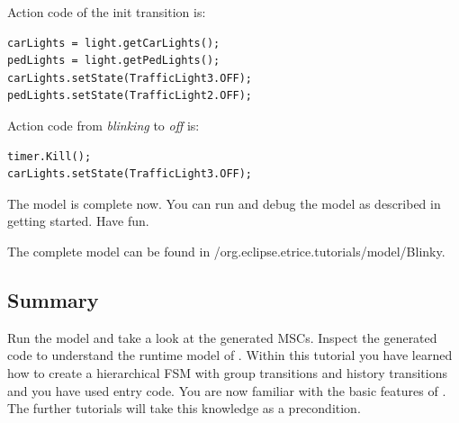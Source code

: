 Action code of the init transition is:

\begin{verbatim}
carLights = light.getCarLights();
pedLights = light.getPedLights();
carLights.setState(TrafficLight3.OFF);
pedLights.setState(TrafficLight2.OFF);
\end{verbatim}

Action code from \textit{blinking} to \textit{off} is:

\begin{verbatim}
timer.Kill();
carLights.setState(TrafficLight3.OFF); 
\end{verbatim}

The model is complete now. You can run and debug the model as described in getting started. Have fun.

The complete model can be found in /org.eclipse.etrice.tutorials/model/Blinky.

\subsection{Summary}

Run the model and take a look at the generated MSCs. Inspect the generated code to understand the runtime 
model of \eTrice{}. Within this tutorial you have learned how to create a hierarchical FSM with group 
transitions and history transitions and you have used entry code. You are now familiar with the basic 
features of \eTrice{}. The further tutorials will take this knowledge as a precondition.

